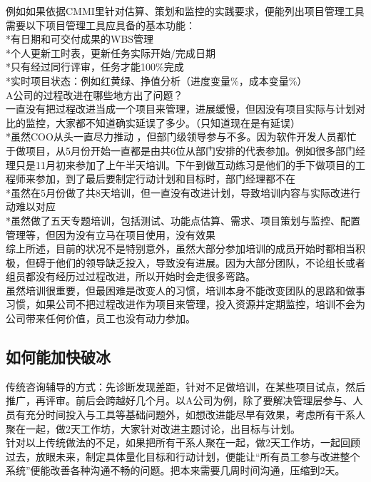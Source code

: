 例如如果依据CMMI里针对估算、策划和监控的实践要求，便能列出项目管理工具需要以下项目管理工具应具备的基本功能：\\
*有日期和可交付成果的WBS管理\\
*个人更新工时表，更新任务实际开始/完成日期\\
*只有经过同行评审，任务才能100\%完成\\
*实时项目状态：例如红黄绿、挣值分析（进度变量\%，成本变量\%）\\
A公司的过程改进在哪些地方出了问题？\\
一直没有把过程改进当成一个项目来管理，进展缓慢，但因没有项目实际与计划对比的监控，大家都不知道确实延误了多少。（只知道现在是有延误）\\
*虽然COO从头一直尽力推动
，但部门级领导参与不多。因为软件开发人员都忙于做项目，从5月份开始一直都是由共6位从部门安排的代表参加。例如很多部门经理只是11月初来参加了上午半天培训。下午到做互动练习是他们的手下做项目的工程师来参加，到了最后要制定行动计划和目标时，部门经理都不在\\
*虽然在5月份做了共8天培训，但一直没有改进计划，导致培训内容与实际改进行动难以对应\\
*虽然做了五天专题培训，包括测试、功能点估算、需求、项目策划与监控、配置管理等，但因为没有立马在项目使用，没有效果\\
综上所述，目前的状况不是特别意外，虽然大部分参加培训的成员开始时都相当积极，但碍于他们的领导缺乏投入，导致没有进展。因为大部分团队，不论组长或者组员都没有经历过过程改进，所以开始时会走很多弯路。\\
虽然培训很重要，但最困难是改变人的习惯，培训本身不能改变团队的思路和做事习惯，如果公司不把过程改进作为项目来管理，投入资源并定期监控，培训不会为公司带来任何价值，员工也没有动力参加。

\hypertarget{ux5982ux4f55ux80fdux52a0ux5febux7834ux51b0}{%
\subsection{如何能加快破冰}\label{ux5982ux4f55ux80fdux52a0ux5febux7834ux51b0}}

传统咨询辅导的方式：先诊断发现差距，针对不足做培训，在某些项目试点，然后推广，再评审。前后会跨越好几个月。以A公司为例，除了要解决管理层参与、人员有充分时间投入与工具等基础问题外，如想改进能尽早有效果，考虑所有干系人聚在一起，做2天工作坊，大家针对改进主题讨论，出目标与计划。\\
针对以上传统做法的不足，如果把所有干系人聚在一起，做2天工作坊，一起回顾过去，放眼未来，制定具体量化目标和行动计划，便能让``所有员工参与改进整个系统''便能改善各种沟通不畅的问题。把本来需要几周时间沟通，压缩到2天。

